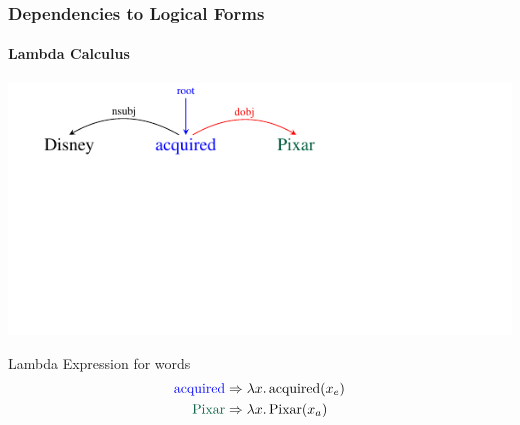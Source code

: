 \documentclass[mathserif,12pt]{beamer}
\newcommand{\lspace}{.\,}
\begin{document}
\begin{frame}[noframenumbering]
\frametitle{Dependencies to Logical Forms}
\framesubtitle{Lambda Calculus}
\vspace{-2.4em}
\begin{center}
\includegraphics[trim=2em 9.4em 10em 0em,clip=true,scale=1.3]{figures/pixar_dobj}

\end{center}

\vspace{1cm}

\begin{block}{\centering Lambda Expression for words}
\vspace{-0.5cm}
\begin{align*}
  \hbox{\color{blue} acquired} & \Rightarrow  \lambda x \lspace \hbox{acquired}(x_e)  \\
  \hbox{\color{blue!40!green!60!black} Pixar} & \Rightarrow  \lambda x \lspace \hbox{Pixar}(x_a) 
\end{align*}
\vspace{-0.5cm}
\end{block}
\end{frame}
\end{document}
